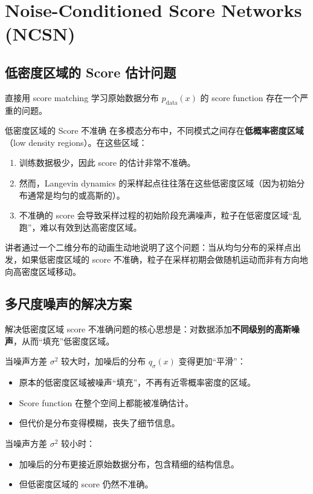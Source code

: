 \section{Noise-Conditioned Score Networks (NCSN)}

\subsection{低密度区域的 Score 估计问题}

直接用 score matching 学习原始数据分布 $p_{\text{data}}(x)$ 的 score function 存在一个严重的问题。

\begin{warningbox}{低密度区域的 Score 不准确}
在多模态分布中，不同模式之间存在\textbf{低概率密度区域}（low density regions）。在这些区域：
\begin{enumerate}
    \item 训练数据极少，因此 score 的估计非常不准确。
    \item 然而，Langevin dynamics 的采样起点往往落在这些低密度区域（因为初始分布通常是均匀的或高斯的）。
    \item 不准确的 score 会导致采样过程的初始阶段充满噪声，粒子在低密度区域``乱跑''，难以有效到达高密度区域。
\end{enumerate}
\end{warningbox}

讲者通过一个二维分布的动画生动地说明了这个问题：当从均匀分布的采样点出发，如果低密度区域的 score 不准确，粒子在采样初期会做随机运动而非有方向地向高密度区域移动。

\subsection{多尺度噪声的解决方案}

解决低密度区域 score 不准确问题的核心思想是：对数据添加\textbf{不同级别的高斯噪声}，从而``填充''低密度区域。

当噪声方差 $\sigma^2$ 较大时，加噪后的分布 $q_\sigma(x)$ 变得更加``平滑''：
\begin{itemize}
    \item 原本的低密度区域被噪声``填充''，不再有近零概率密度的区域。
    \item Score function 在整个空间上都能被准确估计。
    \item 但代价是分布变得模糊，丧失了细节信息。
\end{itemize}

当噪声方差 $\sigma^2$ 较小时：
\begin{itemize}
    \item 加噪后的分布更接近原始数据分布，包含精细的结构信息。
    \item 但低密度区域的 score 仍然不准确。
\end{itemize}

